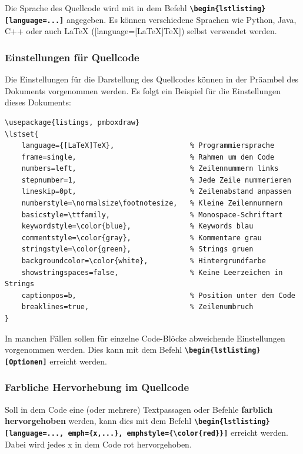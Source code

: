 Die Sprache des Quellcode wird mit in dem Befehl \textbf{\texttt{\textbackslash begin\{lstlisting\}[language=...]}} angegeben. Es können verschiedene Sprachen wie Python, Java, C++ oder auch \LaTeX{} ([language={[LaTeX]TeX}]) selbst verwendet werden.

\newpage

\subsubsection{Einstellungen für Quellcode}
Die Einstellungen für die Darstellung des Quellcodes können in der Präambel des Dokuments vorgenommen werden. Es folgt ein Beispiel für die Einstellungen dieses Dokuments:

\begin{lstlisting}[language={[LaTeX]TeX}]
\usepackage{listings, pmboxdraw}
\lstset{
    language={[LaTeX]TeX},                  % Programmiersprache
    frame=single,                           % Rahmen um den Code
    numbers=left,                           % Zeilennummern links
    stepnumber=1,                           % Jede Zeile nummerieren
    lineskip=0pt,                           % Zeilenabstand anpassen
    numberstyle=\normalsize\footnotesize,   % Kleine Zeilennummern
    basicstyle=\ttfamily,                   % Monospace-Schriftart
    keywordstyle=\color{blue},              % Keywords blau
    commentstyle=\color{gray},              % Kommentare grau
    stringstyle=\color{green},              % Strings gruen
    backgroundcolor=\color{white},          % Hintergrundfarbe
    showstringspaces=false,                 % Keine Leerzeichen in Strings
    captionpos=b,                           % Position unter dem Code 
    breaklines=true,                        % Zeilenumbruch
}
\end{lstlisting}

In manchen Fällen sollen für einzelne Code-Blöcke abweichende Einstellungen vorgenommen werden. Dies kann mit dem Befehl \textbf{\texttt{\textbackslash begin\{lstlisting\}[Optionen]}} erreicht werden.

\subsubsection{Farbliche Hervorhebung im Quellcode}
Soll in dem Code eine (oder mehrere) Textpassagen oder Befehle \textbf{farblich hervorgehoben} werden, kann dies mit dem Befehl \textbf{\texttt{\textbackslash begin\{lstlisting\}[language=..., emph=\{x,...\}, emphstyle=\{\textbackslash color\{red\}\}]}} erreicht werden. Dabei wird jedes x in dem Code rot hervorgehoben.

